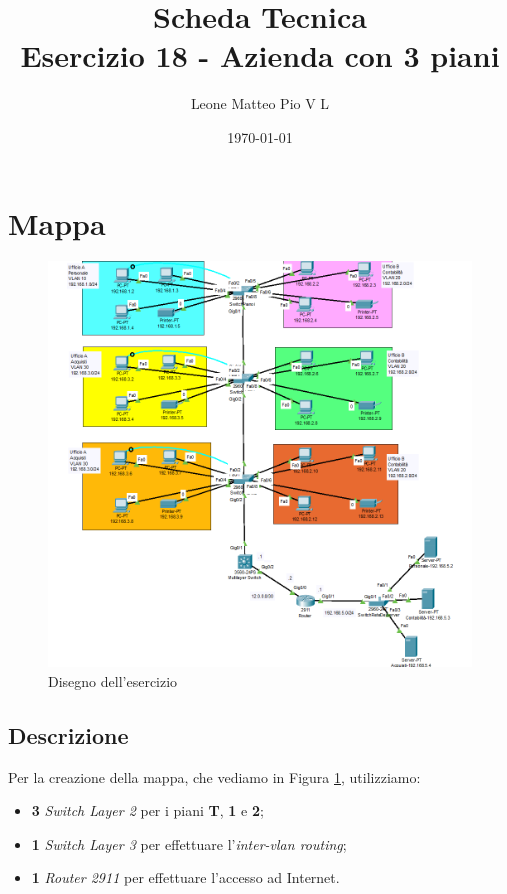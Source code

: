\documentclass[12pt]{article}
\title{Scheda Tecnica \\ 
        Esercizio 18 - Azienda con 3 piani}
\author{Leone Matteo Pio V L}
\date{\today}
\begin{document}
    \maketitle
    \tableofcontents
    \fancyhead[C]{}
    \fancyhead[L]{}
    \fancyhead[R]{}



    \newpage

    \noindent \section{Mappa}
        \begin{figure}[h!]
            \begin{center}
                \label{fig:mappa}
                \caption{Disegno dell'esercizio}
                \includegraphics[width = 15cm]{Assets/MappaCompletapng.png}
            \end{center}
        \end{figure}

    \subsection{Descrizione}
    \noindent Per la creazione della mappa, che vediamo in Figura \ref*{fig:mappa}, utilizziamo: 
        \begin{itemize}
            \item \textbf{3} \textit{Switch Layer 2} per i piani \textbf{T}, \textbf{1} e \textbf{2};
            \item \textbf{1} \textit{Switch Layer 3} per effettuare l'\textit{inter-vlan routing};
            \item \textbf{1} \textit{Router 2911} per effettuare l'accesso ad Internet.
        \end{itemize} 
\end{document}

